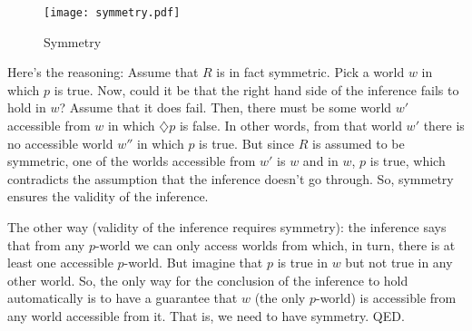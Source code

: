 %
\begin{figure}[htbp]
  \centering
    \texttt{[image: symmetry.pdf]}
  \caption{Symmetry}
  \label{fig:symmetry}
\end{figure}
%
Here's the reasoning: Assume that $R$ is in fact symmetric. Pick a world $w$ in
which $p$ is true. Now, could it be that the right hand side of the inference
fails to hold in $w$? Assume that it does fail. Then, there must be some world
$w'$ accessible from $w$ in which $\diamondsuit p$ is false. In other words,
from that world $w'$ there is no accessible world $w''$ in which $p$ is true.
But since $R$ is assumed to be symmetric, one of the worlds accessible from $w'$
is $w$ and in $w$, $p$ is true, which contradicts the assumption that the
inference doesn't go through. So, symmetry ensures the validity of the
inference.

The other way (validity of the inference requires symmetry): the inference says
that from any $p$-world we can only access worlds from which, in turn,
there is at least one accessible $p$-world. But imagine that $p$ is true in $w$
but not true in any other world. So, the only way for the conclusion of the
inference to hold automatically is to have a guarantee that $w$ (the only
$p$-world) is accessible from any world accessible from it. That is, we need to
have symmetry. QED.

